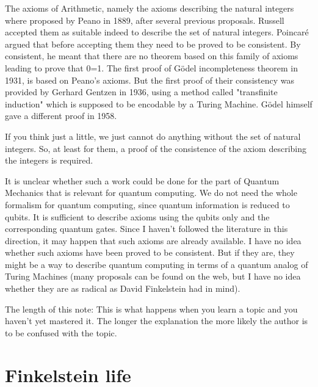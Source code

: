 The axioms of Arithmetic, namely the axioms describing the natural
integers where proposed by Peano in 1889, after several previous
proposals. Russell accepted them as suitable indeed to describe the set
of natural integers. Poincar\'e argued that before accepting them they need
to be proved to be consistent. By consistent, he meant that there are no
theorem based on this family of axioms leading to prove that 0=1. The
first proof of G\"odel incompleteness theorem in 1931, is based on Peano's
axioms. But the first proof of their consistency was provided by Gerhard
Gentzen in 1936, using a method called "transfinite induction" which is
supposed to be encodable by a Turing Machine. G\"odel himself gave a
different proof in 1958.

If you think just a little, we just cannot do anything without the set of
natural integers. So, at least for them, a proof of the consistence of
the axiom describing the integers is required.

It is unclear whether such a work could be done for the part of Quantum
Mechanics that is relevant for quantum computing. We do not need the
whole formalism for quantum computing, since quantum information is
reduced to qubits. It is sufficient to describe axioms using the qubits
only and the corresponding quantum gates. Since I haven't followed the
literature in this direction, it may happen that such axioms are already
available. I have no idea whether such axioms have been proved to be
consistent. But if they are, they might be a way to describe quantum
computing in terms of a quantum analog of Turing Machines (many proposals
can be found on the web, but I have no idea whether they are as radical
as David Finkelstein had in mind).

The length of this note: This is what happens when you learn a topic and
you haven't yet mastered it. The longer the explanation the more likely
the author is to be confused with the topic.

\section{Finkelstein life}
\label{sect:FinkelsteinLife}

